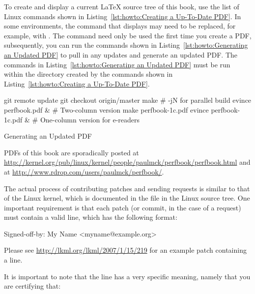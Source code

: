To create and display a current \LaTeX{} source tree of this book,
use the list of Linux commands shown in
Listing~\ref{lst:howto:Creating a Up-To-Date PDF}.
In some environments, the  command that displays 
may need to be replaced, for example, with .
The  command need only be used the first time you
create a PDF, subsequently, you can run the commands shown in
Listing~\ref{lst:howto:Generating an Updated PDF} to pull in any updates
and generate an updated PDF.
The commands in
Listing~\ref{lst:howto:Generating an Updated PDF}
must be run within the  directory created by the commands
shown in
Listing~\ref{lst:howto:Creating a Up-To-Date PDF}.

\begin{listing}[tbp]
\begin{VerbatimL}[numbers=none,xleftmargin=0pt]
git remote update
git checkout origin/master
make                     # -jN for parallel build
evince perfbook.pdf &    # Two-column version
make perfbook-1c.pdf
evince perfbook-1c.pdf & # One-column version for e-readers
\end{VerbatimL}
\caption{Generating an Updated PDF}
\label{lst:howto:Generating an Updated PDF}
\end{listing}

PDFs of this book are sporadically posted at
\url{http://kernel.org/pub/linux/kernel/people/paulmck/perfbook/perfbook.html}
and at
\url{http://www.rdrop.com/users/paulmck/perfbook/}.

The actual process of contributing patches and sending 
requests is similar to that of the Linux kernel, which is documented
in the  file in the Linux source tree.
One important requirement is that each patch (or commit, in the case
of a  request) must contain a valid  line,
which has the following format:

\begin{VerbatimU}
Signed-off-by: My Name <myname@example.org>
\end{VerbatimU}

Please see \url{http://lkml.org/lkml/2007/1/15/219} for an example
patch containing a  line.

It is important to note that the  line has
a very specific meaning, namely that you are certifying that:

